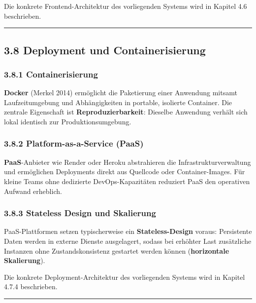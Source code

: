 Die konkrete Frontend-Architektur des vorliegenden Systems wird in
Kapitel 4.6 beschrieben.

\begin{center}\rule{0.5\linewidth}{0.5pt}\end{center}

\subsection{3.8 Deployment und
Containerisierung}\label{deployment-und-containerisierung}

\subsubsection{3.8.1 Containerisierung}\label{containerisierung}

\textbf{Docker} (Merkel 2014) ermöglicht die Paketierung einer Anwendung
mitsamt Laufzeitumgebung und Abhängigkeiten in portable, isolierte
Container. Die zentrale Eigenschaft ist \textbf{Reproduzierbarkeit}:
Dieselbe Anwendung verhält sich lokal identisch zur Produktionsumgebung.

\subsubsection{3.8.2 Platform-as-a-Service
(PaaS)}\label{platform-as-a-service-paas}

\textbf{PaaS}-Anbieter wie Render oder Heroku abstrahieren die
Infrastrukturverwaltung und ermöglichen Deployments direkt aus Quellcode
oder Container-Images. Für kleine Teams ohne dedizierte
DevOps-Kapazitäten reduziert PaaS den operativen Aufwand erheblich.

\subsubsection{3.8.3 Stateless Design und
Skalierung}\label{stateless-design-und-skalierung}

PaaS-Plattformen setzen typischerweise ein \textbf{Stateless-Design}
voraus: Persistente Daten werden in externe Dienste ausgelagert, sodass
bei erhöhter Last zusätzliche Instanzen ohne Zustandskonsistenz
gestartet werden können (\textbf{horizontale Skalierung}).

Die konkrete Deployment-Architektur des vorliegenden Systems wird in
Kapitel 4.7.4 beschrieben.

\begin{center}\rule{0.5\linewidth}{0.5pt}\end{center}

